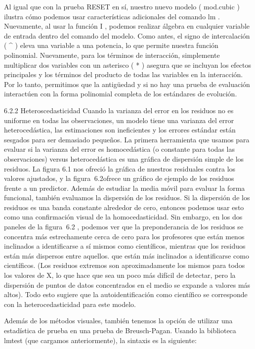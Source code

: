 \documentclass[
]{book}
\begin{document}
Al igual que con la prueba RESET en sí, nuestro nuevo modelo ( mod.cubic ) ilustra cómo podemos usar características adicionales del comando lm . Nuevamente, al usar la función I , podemos realizar álgebra en cualquier variable de entrada dentro del comando del modelo. Como antes, el signo de intercalación ( \^{} ) eleva una variable a una potencia, lo que permite nuestra función polinomial. Nuevamente, para los términos de interacción, simplemente multiplicar dos variables con un asterisco ( * ) asegura que se incluyan los efectos principales y los términos del producto de todas las variables en la interacción. Por lo tanto, permitimos que la antigüedad y si no hay una prueba de evaluación interactúen con la forma polinomial completa de los estándares de evolución.

6.2.2 Heteroscedasticidad
Cuando la varianza del error en los residuos no es uniforme en todas las observaciones, un modelo tiene una varianza del error heterocedástica, las estimaciones son ineficientes y los errores estándar están sesgados para ser demasiado pequeños. La primera herramienta que usamos para evaluar si la varianza del error es homocedástica (o constante para todas las observaciones) versus heterocedástica es una gráfica de dispersión simple de los residuos. La figura 6.1 nos ofreció la gráfica de nuestros residuales contra los valores ajustados, y la figura  6.2ofrece un gráfico de ejemplo de los residuos frente a un predictor. Además de estudiar la media móvil para evaluar la forma funcional, también evaluamos la dispersión de los residuos. Si la dispersión de los residuos es una banda constante alrededor de cero, entonces podemos usar esto como una confirmación visual de la homocedasticidad. Sin embargo, en los dos paneles de la figura  6.2 , podemos ver que la preponderancia de los residuos se concentra más estrechamente cerca de cero para los profesores que están menos inclinados a identificarse a sí mismos como científicos, mientras que los residuos están más dispersos entre aquellos. que están más inclinados a identificarse como científicos. (Los residuos extremos son aproximadamente los mismos para todos los valores de X, lo que hace que sea un poco más difícil de detectar, pero la dispersión de puntos de datos concentrados en el medio se expande a valores más altos). Todo esto sugiere que la autoidentificación como científico se corresponde con la heterocedasticidad para este modelo.

Además de los métodos visuales, también tenemos la opción de utilizar una estadística de prueba en una prueba de Breusch-Pagan. Usando la biblioteca lmtest (que cargamos anteriormente), la sintaxis es la siguiente:
\end{document}

